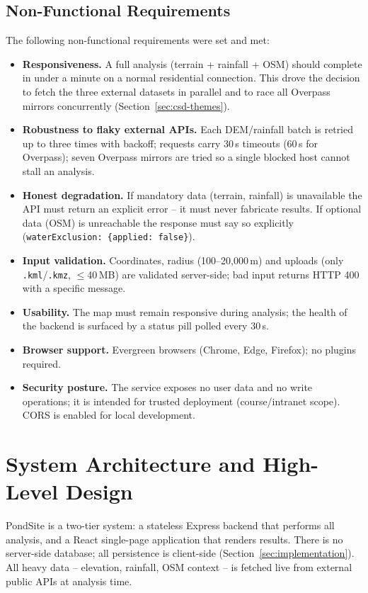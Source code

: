 \documentclass[manuscript,screen,review]{acmart}
\begin{document}
\subsection{Non-Functional Requirements}
The following non-functional requirements were set and met:

\begin{itemize}
  \item \textbf{Responsiveness.} A full analysis (terrain + rainfall + OSM)
  should complete in under a minute on a normal residential connection.
  This drove the decision to fetch the three external datasets in parallel
  and to race all Overpass mirrors concurrently (Section~\ref{sec:csd-themes}).
  \item \textbf{Robustness to flaky external APIs.} Each DEM/rainfall batch
  is retried up to three times with backoff; requests carry 30\,s timeouts
  (60\,s for Overpass); seven Overpass mirrors are tried so a single blocked
  host cannot stall an analysis.
  \item \textbf{Honest degradation.} If mandatory data (terrain, rainfall)
  is unavailable the API must return an explicit error -- it must never
  fabricate results. If optional data (OSM) is unreachable the response must
  say so explicitly (\texttt{waterExclusion:\ \{applied:\ false\}}).
  \item \textbf{Input validation.} Coordinates, radius (100--20{,}000\,m) and
  uploads (only \texttt{.kml}/\texttt{.kmz}, $\leq$40\,MB) are validated
  server-side; bad input returns HTTP 400 with a specific message.
  \item \textbf{Usability.} The map must remain responsive during analysis;
  the health of the backend is surfaced by a status pill polled every 30\,s.
  \item \textbf{Browser support.} Evergreen browsers (Chrome, Edge, Firefox);
  no plugins required.
  \item \textbf{Security posture.} The service exposes no user data and no
  write operations; it is intended for trusted deployment (course/intranet
  scope). CORS is enabled for local development.
\end{itemize}

\section{System Architecture and High-Level Design}
\label{sec:architecture}
PondSite is a two-tier system: a stateless Express backend that performs all
analysis, and a React single-page application that renders results. There is
no server-side database; all persistence is client-side
(Section~\ref{sec:implementation}). All heavy data -- elevation, rainfall,
OSM context -- is fetched live from external public APIs at analysis time.
\end{document}
